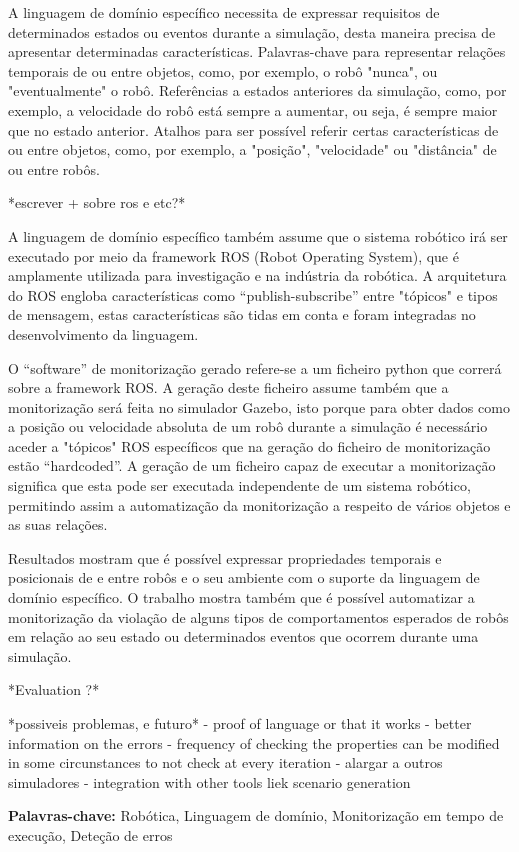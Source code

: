 A linguagem de domínio específico necessita de expressar requisitos de determinados estados ou eventos durante a simulação, desta maneira precisa de apresentar determinadas características. Palavras-chave para representar relações temporais de ou entre objetos, como, por exemplo, o robô "nunca", ou "eventualmente" o robô. Referências a estados anteriores da simulação, como, por exemplo, a velocidade do robô está sempre a aumentar, ou seja, é sempre maior que no estado anterior. Atalhos para ser possível referir certas características de ou entre objetos, como, por exemplo, a "posição", "velocidade" ou "distância" de ou entre robôs.

*escrever + sobre ros e etc?*

A linguagem de domínio específico também assume que o sistema robótico irá ser executado por meio da framework ROS (Robot Operating System), que é amplamente utilizada para investigação e na indústria da robótica. A arquitetura do ROS engloba características como “publish-subscribe” entre "tópicos" e tipos de mensagem, estas características são tidas em conta e foram integradas no desenvolvimento da linguagem.

O “software” de monitorização gerado refere-se a um ficheiro python que correrá sobre a framework ROS. A geração deste ficheiro assume também que a monitorização será feita no simulador Gazebo, isto porque para obter dados como a posição ou velocidade absoluta de um robô durante a simulação é necessário aceder a "tópicos" ROS específicos que na geração do ficheiro de monitorização estão “hardcoded”. A geração de um ficheiro capaz de executar a monitorização significa que esta pode ser executada independente de um sistema robótico, permitindo assim a automatização da monitorização a respeito de vários objetos e as suas relações.

Resultados mostram que é possível expressar propriedades temporais e posicionais de e entre robôs e o seu ambiente com o suporte da linguagem de domínio específico. O trabalho mostra também que é possível automatizar a monitorização da violação de alguns tipos de comportamentos esperados de robôs em relação ao seu estado ou determinados eventos que ocorrem durante uma simulação.

*Evaluation ?*

*possiveis problemas, e futuro* - proof of language or that it works - better information on the errors - frequency of checking the properties can be modified in some circunstances to not check at every iteration - alargar a outros simuladores - integration with other tools liek scenario generation


\vfill

\begin{flushleft}
\textbf{Palavras-chave:}
Robótica, Linguagem de domínio, Monitorização em tempo de execução, Deteção de erros
\end{flushleft}

